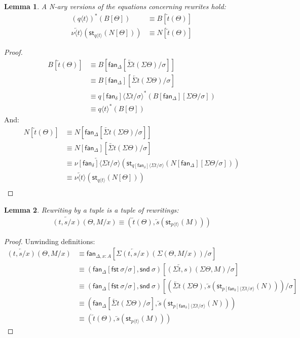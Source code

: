 \documentclass[10pt]{article}
\newtheorem{lemma}{Lemma}
\theoremstyle{definition}
\newcommand\dsd[1]{\ensuremath{\mathsf{#1}}}
\newcommand{\rewrite}[2]{\overleftarrow{#1}(#2)}
\newcommand\St[2]{\ensuremath{{#1}^*(#2)}}
\newcommand\StI[2]{\ensuremath{\mathsf{st}_{#1}(#2)}}
\newcommand\fan[1]{\ensuremath{\mathsf{fan}_{#1}}}
\newcommand\ap[2]{\ensuremath{#1 \langle #2 \rangle }}
\newcommand{\app}[2]{\ensuremath{#1 \: #2}}
\newcommand{\fst}[1]{\app{\dsd{fst}}{#1}}
\newcommand{\snd}[1]{\app{\dsd{snd}}{#1}}
\begin{document}
\begin{lemma}
A N-ary versions of the equations concerning rewrites hold:
\begin{align*}
\St{(\ap{q}{t})}{B[\Theta]} &\equiv B[\rewrite{t}{\Theta}] \\
\rewrite{\ap{\nu}{t}}{\StI{\ap{q}{t}}{N[\Theta]}} &\equiv N[\rewrite{t}{\Theta}]
\end{align*}
\end{lemma}
\begin{proof}
\begin{align*}
B[\rewrite{t}{\Theta}] 
&\equiv B[\fan{\Delta}[\rewrite{\Sigma t}{\Sigma \Theta}/\sigma]] \\
&\equiv B[\fan{\Delta}][\rewrite{\Sigma t}{\Sigma \Theta}/\sigma] \\
&\equiv \St{\ap{q[\fan{\delta}]}{\Sigma t / \sigma}}{B[\fan{\Delta}][\Sigma \Theta/\sigma]} \\
&\equiv \St{\ap{q}{t}}{B[\Theta]}
\end{align*}
And:
\begin{align*}
N[\rewrite{t}{\Theta}]
&\equiv N[\fan{\Delta}[\rewrite{\Sigma t}{\Sigma \Theta}/\sigma]] \\
&\equiv N[\fan{\Delta}][\rewrite{\Sigma t}{\Sigma \Theta}/\sigma] \\
&\equiv \rewrite{\ap{\nu[\fan{\delta}]}{\Sigma t/\sigma}}{\StI{\ap{q[\fan{\delta}]}{\Sigma t/\sigma}}{N[\fan{\Delta}][\Sigma \Theta/\sigma]}} \\
&\equiv \rewrite{\ap{\nu}{t}}{\StI{\ap{q}{t}}{N[\Theta]}} \\
\end{align*}
\end{proof}

\begin{lemma}
Rewriting by a tuple is a tuple of rewritings:
\begin{align*}
\rewrite{(t, s/x)}{\Theta, M/x} \equiv (\rewrite{t}{\Theta}, \rewrite{s}{\StI{\ap{p}{t}}{M}})
\end{align*}
\end{lemma}
\begin{proof}
Unwinding definitions:
\begin{align*}
\rewrite{(t, s/x)}{\Theta, M/x}
&\equiv \fan{\Delta, x : A}[\rewrite{\Sigma (t, s/x)}{\Sigma (\Theta, M/x)}/\sigma] \\
&\equiv (\fan\Delta[\fst{\sigma}/\sigma], \snd{\sigma})[\rewrite{(\Sigma t, s)}{\Sigma\Theta, M}/\sigma] \\
&\equiv (\fan\Delta[\fst{\sigma}/\sigma], \snd{\sigma})[(\rewrite{\Sigma t}{\Sigma\Theta}, \rewrite{s}{\StI{\ap{p[\fan{\delta}]}{\Sigma t/\sigma}}{N}})/\sigma] \\
&\equiv (\fan\Delta[\rewrite{\Sigma t}{\Sigma\Theta}/\sigma], \rewrite{s}{\StI{\ap{p[\fan{\delta}]}{\Sigma t/\sigma}}{N}}) \\
&\equiv (\rewrite{t}{\Theta}, \rewrite{s}{\StI{\ap{p}{t}}{M}})
\end{align*}
\end{proof}
\end{document}
